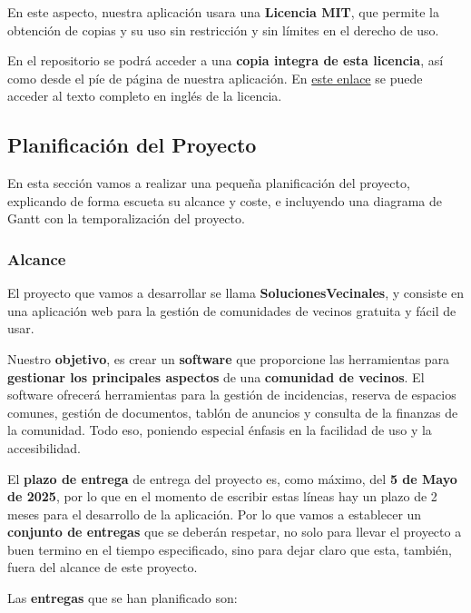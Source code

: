 En este aspecto, nuestra aplicación usara una \textbf{Licencia MIT}, que permite la obtención de copias y su uso sin restricción y sin límites en el derecho de uso. \cite{mit}

En el repositorio se podrá acceder a una \textbf{copia integra de esta licencia}, así como desde el píe de página de nuestra aplicación. En \href{https://opensource.org/license/mit}{este enlace} se puede acceder al texto completo en inglés de la licencia.



\subsection{Planificación del Proyecto}
En esta sección vamos a realizar una pequeña planificación del proyecto, explicando de forma escueta su alcance y coste, e incluyendo una diagrama de Gantt con la temporalización del proyecto.

\subsubsection{Alcance}
El proyecto que vamos a desarrollar se llama \textbf{SolucionesVecinales}, y consiste en una aplicación web para la gestión de comunidades de vecinos gratuita y fácil de usar.

Nuestro \textbf{objetivo}, es crear un \textbf{software} que proporcione las herramientas para \textbf{gestionar los principales aspectos} de una \textbf{comunidad de vecinos}. El software ofrecerá herramientas para la gestión de incidencias, reserva de espacios comunes, gestión de documentos, tablón de anuncios y consulta de la finanzas de la comunidad. Todo eso, poniendo especial énfasis en la facilidad de uso y la accesibilidad.

El \textbf{plazo de entrega} de entrega del proyecto es, como máximo, del \textbf{5 de Mayo de 2025}, por lo que en el momento de escribir estas líneas hay un plazo de 2 meses para el desarrollo de la aplicación. Por lo que vamos a establecer un \textbf{conjunto de entregas} que se deberán respetar, no solo para llevar el proyecto a buen termino en el tiempo especificado, sino para dejar claro que esta, también, fuera del alcance de este proyecto.

Las \textbf{entregas} que se han planificado son:


